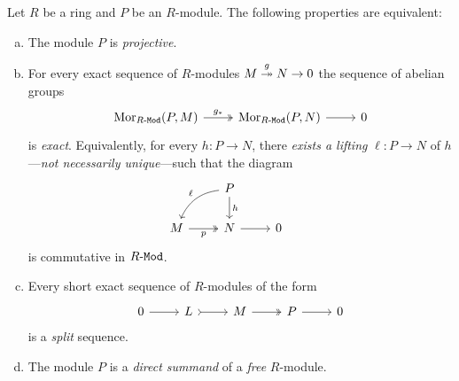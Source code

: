 \begin{proposition}
    \label{prop:equivalences-projective-module}
    Let \(R\) be a ring and \(P\) be an \(R\)-module. The following properties are equivalent:
    \begin{enumerate}[(a)]\setlength\itemsep{0em}
        \item The module \(P\) is \emph{projective}.

        \item For every exact sequence of \(R\)-modules \(M \overset{g}{\twoheadrightarrow} N \to 0\)
              the sequence of abelian groups
              \[
                  \begin{tikzcd}
                      \Hom_{\Mod{R}}(P, M) \ar[r, "g_{*}", two heads]
                      &\Hom_{\Mod{R}}(P, N) \ar[r] &0
                  \end{tikzcd}
              \]
              is \emph{exact}. Equivalently, for every \(h: P \to N\), there \emph{exists a
                  lifting} \(\ell: P \to N\) of \(h\)---\emph{not necessarily unique}---such
              that the diagram
              \[
                  \begin{tikzcd}
                      &P \ar[d, "h"] \ar[dl, bend right, "\ell"'] & & \\
                      M \ar[r, two heads, "p"'] &N \ar[r] &0
                  \end{tikzcd}
              \]
              is commutative in \({R\text{-}\texttt{Mod}}\).

        \item Every short exact sequence of \(R\)-modules of the form
              \[
                  \begin{tikzcd}
                      0 \ar[r] &L \ar[r, tail] &M \ar[r, two heads] &P \ar[r] &0
                  \end{tikzcd}
              \]
              is a \emph{split} sequence.

        \item The module \(P\) is a \emph{direct summand} of a \emph{free} \(R\)-module.


\end{enumerate}
\end{proposition}
